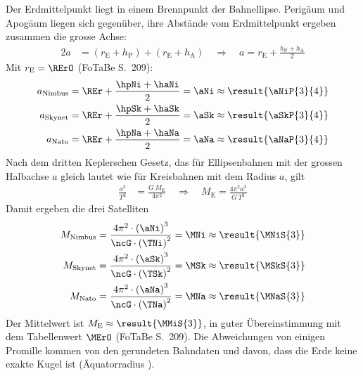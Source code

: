 \begin{center}
\end{center}

Der Erdmittelpunkt liegt in einem Brennpunkt der Bahnellipse. Perigäum und Apogäum liegen sich gegenüber, ihre Abstände vom Erdmittelpunkt ergeben zusammen die grosse Achse:
\begin{align}
 2a &= \left(r_\mathrm{E}+h_\mathrm{P}\right)+\left(r_\mathrm{E}+h_\mathrm{A}\right)
 \quad\Rightarrow\quad a = r_\mathrm{E}+\frac{h_\mathrm{P}+h_\mathrm{A}}{2}
\end{align}
Mit $r_\mathrm{E} = \RErO$ (FoTaBe S.~209):
\begin{align}
 a_\text{Nimbus} &= \REr+\frac{\hpNi+\haNi}{2} = \aNi \approx \result{\aNiP{3}{4}} \\
 a_\text{Skynet} &= \REr+\frac{\hpSk+\haSk}{2} = \aSk \approx \result{\aSkP{3}{4}} \\
 a_\text{Nato} &= \REr+\frac{\hpNa+\haNa}{2} = \aNa \approx \result{\aNaP{3}{4}}
\end{align}
Nach dem dritten Keplerschen Gesetz, das für Ellipsenbahnen mit der grossen Halbachse $a$ gleich lautet wie für Kreisbahnen mit dem Radius $a$, gilt
\begin{align}
 \frac{a^3}{T^2} &= \frac{G\,M_\mathrm{E}}{4\pi^2}
 \quad\Rightarrow\quad M_\mathrm{E} = \frac{4\pi^2 a^3}{G\,T^2}
\end{align}
Damit ergeben die drei Satelliten
\begin{align}
 M_\text{Nimbus} &= \frac{4\pi^2\cdot\left(\aNi\right)^3}{\ncG\cdot\left(\TNi\right)^2} = \MNi \approx \result{\MNiS{3}} \\
 M_\text{Skynet} &= \frac{4\pi^2\cdot\left(\aSk\right)^3}{\ncG\cdot\left(\TSk\right)^2} = \MSk \approx \result{\MSkS{3}} \\
 M_\text{Nato} &= \frac{4\pi^2\cdot\left(\aNa\right)^3}{\ncG\cdot\left(\TNa\right)^2} = \MNa \approx \result{\MNaS{3}}
\end{align}
Der Mittelwert ist $M_\mathrm{E} \approx \result{\MMiS{3}}$, in guter Übereinstimmung mit dem Tabellenwert $\MErO$ (FoTaBe S.~209). Die Abweichungen von einigen Promille kommen von den gerundeten Bahndaten und davon, dass die Erde keine exakte Kugel ist (Äquatorradius \RAeqO).
